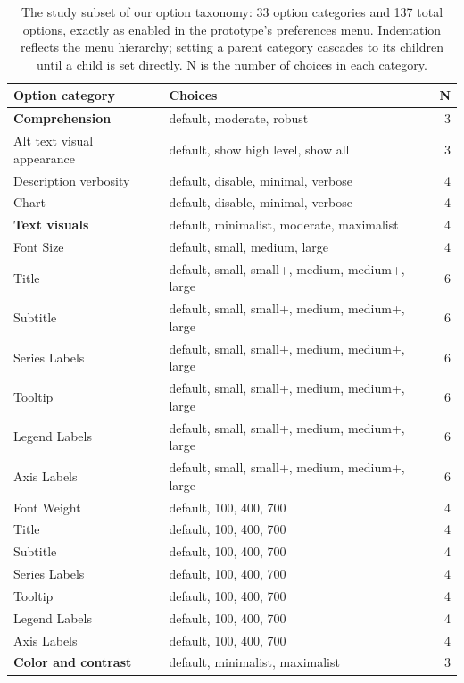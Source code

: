 \documentclass[12pt]{cmuthesis}
\begin{document}
\begin{table}
\centering
\footnotesize
\caption{The study subset of our option taxonomy: 33 option categories and 137 total options, exactly as enabled in the prototype's preferences menu. Indentation reflects the menu hierarchy; setting a parent category cascades to its children until a child is set directly. N is the number of choices in each category.}
\label{tab:softerware-subset}
\begin{tabular}{@{}l p{7.2cm} r@{}}
\toprule
\textbf{Option category} & \textbf{Choices} & \textbf{N} \\
\midrule
\textbf{Comprehension} & default, moderate, robust & 3 \\
\quad Alt text visual appearance & default, show high level, show all & 3 \\
\quad Description verbosity & default, disable, minimal, verbose & 4 \\
\qquad Chart & default, disable, minimal, verbose & 4 \\
\addlinespace
\textbf{Text visuals} & default, minimalist, moderate, maximalist & 4 \\
\quad Font Size & default, small, medium, large & 4 \\
\qquad Title & default, small, small+, medium, medium+, large & 6 \\
\qquad Subtitle & default, small, small+, medium, medium+, large & 6 \\
\qquad Series Labels & default, small, small+, medium, medium+, large & 6 \\
\qquad Tooltip & default, small, small+, medium, medium+, large & 6 \\
\qquad Legend Labels & default, small, small+, medium, medium+, large & 6 \\
\qquad Axis Labels & default, small, small+, medium, medium+, large & 6 \\
\quad Font Weight & default, 100, 400, 700 & 4 \\
\qquad Title & default, 100, 400, 700 & 4 \\
\qquad Subtitle & default, 100, 400, 700 & 4 \\
\qquad Series Labels & default, 100, 400, 700 & 4 \\
\qquad Tooltip & default, 100, 400, 700 & 4 \\
\qquad Legend Labels & default, 100, 400, 700 & 4 \\
\qquad Axis Labels & default, 100, 400, 700 & 4 \\
\addlinespace
\textbf{Color and contrast} & default, minimalist, maximalist & 3 \\

\end{tabular}
\end{table}
\end{document}
